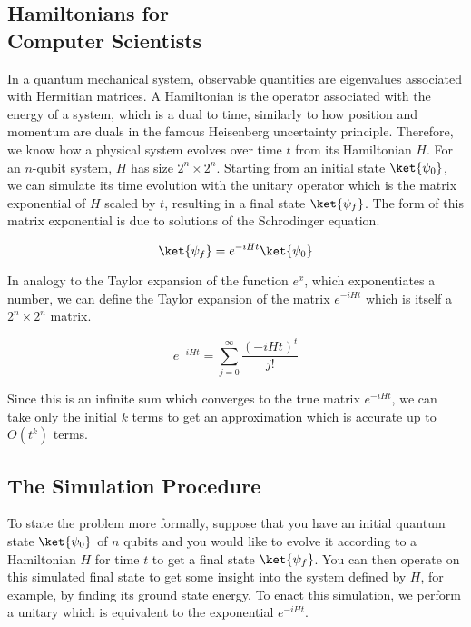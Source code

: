 \subsection{Hamiltonians for \\ Computer Scientists}

In a quantum mechanical system, observable quantities are eigenvalues
associated with Hermitian matrices. A Hamiltonian is the operator associated
with the energy of a system, which is a dual to time, similarly to how
position and momentum are duals in the famous Heisenberg uncertainty principle.
Therefore, we know
how a physical system evolves over time $t$ from its Hamiltonian $H$. For
an $n$-qubit system, $H$ has size $2^n \times 2^n$.
Starting from an initial state $\ket{\psi_0}$, we can simulate its time
evolution with the unitary operator which is the
matrix exponential of $H$ scaled by $t$, resulting in a final state $\ket{\psi_f}$.
The form of this matrix exponential is due to solutions of the Schrodinger
equation.

\begin{equation}
\ket{\psi_f} = e^{-iHt} \ket{\psi_0}
\end{equation}

In analogy to 
the Taylor expansion of the function $e^x$, which exponentiates a number,
we can define the Taylor expansion of the matrix $e^{-iHt}$ which is itself
a $2^n\times 2^n$ matrix.

\begin{equation}
e^{-iHt} = \sum_{j=0}^{\infty} \frac{(-iHt)^t}{j!}
\end{equation}

Since this is an infinite sum which converges to the true matrix
$e^{-iHt}$, we can take only the initial $k$ terms to get an approximation
which is accurate up to $O(t^k)$ terms.

\subsection{The Simulation Procedure}

To state the problem more formally, suppose that you have an initial
quantum state $\ket{\psi_0}$ of $n$ qubits
and you would like to evolve it according to a Hamiltonian $H$ for time
$t$ to get
a final state $\ket{\psi_f}$. You can then operate on this simulated final state
to get some insight into the system defined by $H$, for example, by finding
its ground state energy.
To
enact this simulation, we perform a unitary which is equivalent to the
exponential $e^{-iHt}$.


